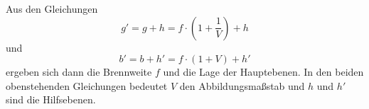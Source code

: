Aus den Gleichungen
\begin{equation}
	g' = g + h = f \cdot \left(1 + \frac{1}{V} \right) + h
\end{equation}
und
\begin{equation}
	b' = b + h' = f \cdot \left(1 + V \right) + h'
\end{equation}
ergeben sich dann die Brennweite $f$ und die Lage der Hauptebenen. In den beiden obenstehenden Gleichungen bedeutet $V$ den Abbildungsmaßstab und $h$ und $h'$ sind die Hilfsebenen.
